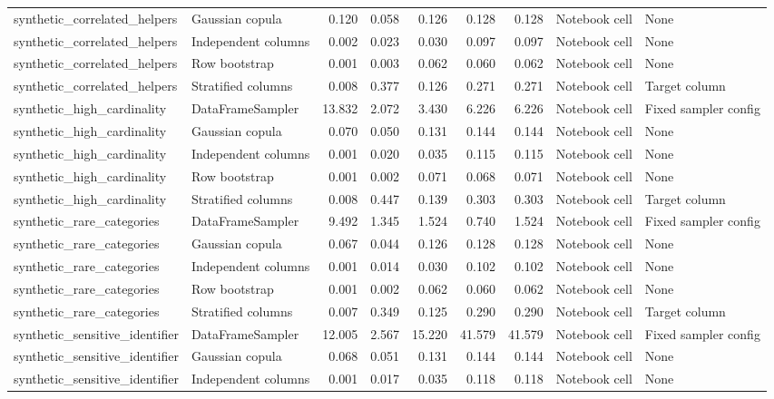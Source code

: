 \begin{table}
\begin{adjustbox}{max width=\textwidth}
\begin{tabular}{llrrrrrll}
synthetic\_correlated\_helpers & Gaussian copula & 0.120 & 0.058 & 0.126 & 0.128 & 0.128 & Notebook cell & None \\
synthetic\_correlated\_helpers & Independent columns & 0.002 & 0.023 & 0.030 & 0.097 & 0.097 & Notebook cell & None \\
synthetic\_correlated\_helpers & Row bootstrap & 0.001 & 0.003 & 0.062 & 0.060 & 0.062 & Notebook cell & None \\
synthetic\_correlated\_helpers & Stratified columns & 0.008 & 0.377 & 0.126 & 0.271 & 0.271 & Notebook cell & Target column \\
synthetic\_high\_cardinality & DataFrameSampler & 13.832 & 2.072 & 3.430 & 6.226 & 6.226 & Notebook cell & Fixed sampler config \\
synthetic\_high\_cardinality & Gaussian copula & 0.070 & 0.050 & 0.131 & 0.144 & 0.144 & Notebook cell & None \\
synthetic\_high\_cardinality & Independent columns & 0.001 & 0.020 & 0.035 & 0.115 & 0.115 & Notebook cell & None \\
synthetic\_high\_cardinality & Row bootstrap & 0.001 & 0.002 & 0.071 & 0.068 & 0.071 & Notebook cell & None \\
synthetic\_high\_cardinality & Stratified columns & 0.008 & 0.447 & 0.139 & 0.303 & 0.303 & Notebook cell & Target column \\
synthetic\_rare\_categories & DataFrameSampler & 9.492 & 1.345 & 1.524 & 0.740 & 1.524 & Notebook cell & Fixed sampler config \\
synthetic\_rare\_categories & Gaussian copula & 0.067 & 0.044 & 0.126 & 0.128 & 0.128 & Notebook cell & None \\
synthetic\_rare\_categories & Independent columns & 0.001 & 0.014 & 0.030 & 0.102 & 0.102 & Notebook cell & None \\
synthetic\_rare\_categories & Row bootstrap & 0.001 & 0.002 & 0.062 & 0.060 & 0.062 & Notebook cell & None \\
synthetic\_rare\_categories & Stratified columns & 0.007 & 0.349 & 0.125 & 0.290 & 0.290 & Notebook cell & Target column \\
synthetic\_sensitive\_identifier & DataFrameSampler & 12.005 & 2.567 & 15.220 & 41.579 & 41.579 & Notebook cell & Fixed sampler config \\
synthetic\_sensitive\_identifier & Gaussian copula & 0.068 & 0.051 & 0.131 & 0.144 & 0.144 & Notebook cell & None \\
synthetic\_sensitive\_identifier & Independent columns & 0.001 & 0.017 & 0.035 & 0.118 & 0.118 & Notebook cell & None \\

\end{tabular}
\end{adjustbox}
\end{table}
